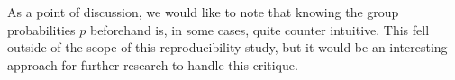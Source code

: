 As a point of discussion, we would like to note that knowing the group probabilities $p$ beforehand is, in some cases, quite counter intuitive. This fell outside of the scope of this reproducibility study, but it would be an interesting approach for further research to handle this critique.




\newpage







